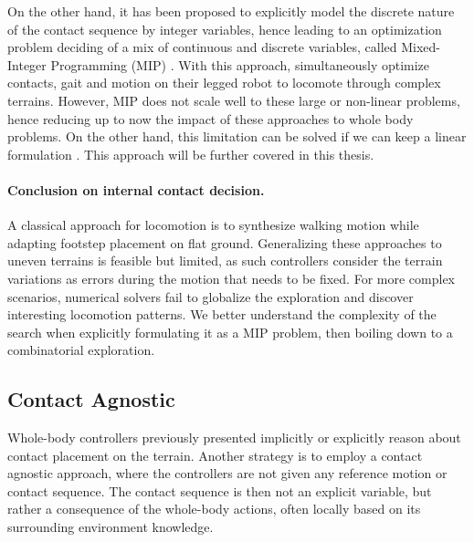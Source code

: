 On the other hand, it has been proposed to explicitly model the discrete nature of the contact sequence by integer variables, hence leading to an optimization problem deciding of a mix of continuous and discrete variables, called Mixed-Integer Programming (MIP) \cite{gurobi_mip}.
With this approach, \cite{deits_2015_planning_motion, carlos_2019} simultaneously optimize contacts, gait and motion on their legged robot to locomote through complex terrains.
However, MIP does not scale well to these large or non-linear problems, hence reducing up to now the impact of these approaches to whole body problems.
On the other hand, this limitation can be solved if we can keep a linear formulation \cite{sl1m_v1}. This approach will be further covered in this thesis.


\paragraph{Conclusion on internal contact decision.}
A classical approach for locomotion is to synthesize walking motion while adapting footstep placement on flat ground.
Generalizing these approaches to uneven terrains is feasible but limited, as such controllers consider the terrain variations as errors during the motion that needs to be fixed.
For more complex scenarios, numerical solvers fail to globalize the exploration and discover interesting locomotion patterns.
We better understand the complexity of the search when explicitly formulating it as a MIP problem, then boiling down to a combinatorial exploration.

\subsection{Contact Agnostic}
Whole-body controllers previously presented implicitly or explicitly reason about contact placement on the terrain.
Another strategy is to employ a contact agnostic approach, where the controllers are not given any reference motion or contact sequence.
The contact sequence is then not an explicit variable, but rather a consequence of the whole-body actions, often locally based on its surrounding environment knowledge.

